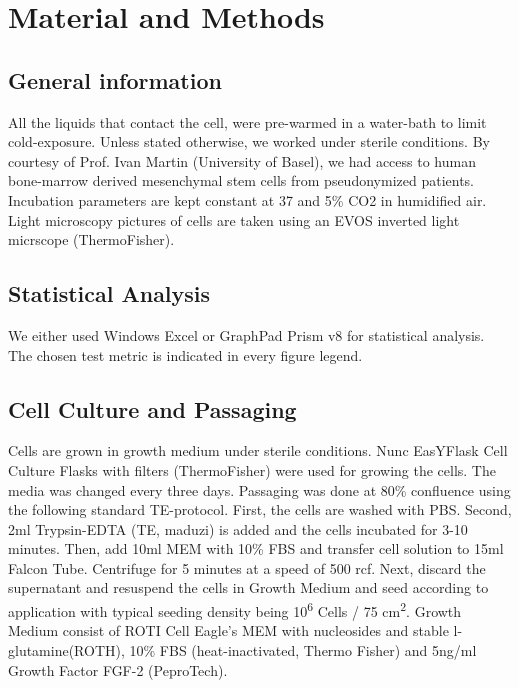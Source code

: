 \newcommand{\product}{\textit}

\chapter{Material and Methods}

\section{General information}
All the liquids that contact the cell, were pre-warmed in a water-bath to limit cold-exposure. Unless stated otherwise, we worked under sterile conditions. By courtesy of Prof. Ivan Martin (University of Basel), we had access to human bone-marrow derived mesenchymal stem cells from pseudonymized patients. Incubation parameters are kept constant at 37 \degC{} and 5\% CO2 in humidified air. Light microscopy pictures of cells are taken using an EVOS inverted light micrscope (ThermoFisher).

\section{Statistical Analysis}
We either used Windows Excel or GraphPad Prism v8 for statistical analysis. The chosen test metric is indicated in every figure legend.

\section{Cell Culture and Passaging}
Cells are grown in growth medium under sterile conditions. Nunc\texttrademark{} EasYFlask\texttrademark{} Cell Culture Flasks with filters (ThermoFisher) were used for growing the cells. The media was changed every three days. Passaging was done at 80\% confluence using the following standard TE-protocol. First, the cells are washed with PBS. Second, 2ml Trypsin-EDTA (TE, maduzi) is added and the cells incubated for 3-10 minutes. Then, add 10ml MEM\textalpha{} with 10\% FBS and transfer cell solution to 15ml Falcon Tube. Centrifuge for 5 minutes at a speed of 500 rcf. Next, discard the supernatant and resuspend the cells in Growth Medium and seed according to application with typical seeding density being 10\textsuperscript{6} Cells / 75 cm\textsuperscript{2}. 
Growth Medium consist of ROTI\textregistered{} Cell Eagle's MEM\textalpha{} with nucleosides and stable l-glutamine(ROTH), 10\% FBS (heat-inactivated, Thermo Fisher) and 5ng/ml Growth Factor FGF-2 (PeproTech).

